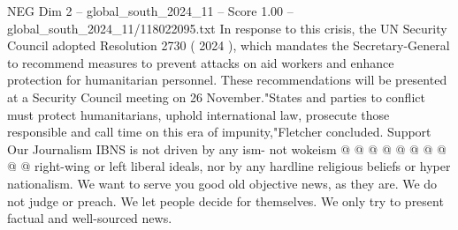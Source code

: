 \begin{textsample}{NEG Dim 2 – global\_south\_2024\_11 – Score 1.00 – global\_south\_2024\_11/118022095.txt}
In response to this crisis, the UN Security Council adopted Resolution 2730 ( 2024 ), which mandates the Secretary-General to recommend measures to prevent attacks on aid workers and enhance protection for humanitarian personnel.
These recommendations will be presented at a Security Council meeting on 26 November."States and parties to conflict must protect humanitarians, uphold international law, prosecute those responsible and call time on this era of impunity,"Fletcher concluded.
Support Our Journalism IBNS is not driven by any ism- not wokeism @ @ @ @ @ @ @ @ @ @ right-wing or left liberal ideals, nor by any hardline religious beliefs or hyper nationalism.
We want to serve you good old objective news, as they are.
We do not judge or preach.
We let people decide for themselves.
We only try to present factual and well-sourced news.

\end{textsample}
